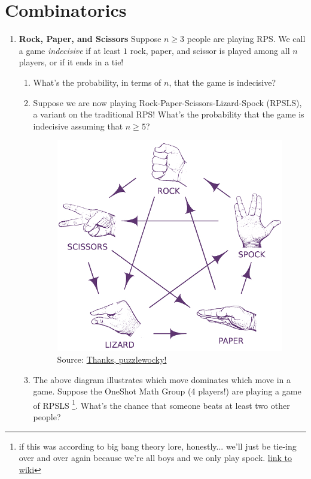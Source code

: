 \documentclass[11pt]{scrartcl}
\begin{document}
\section{Combinatorics}
\begin{enumerate}[label=\textbf{C\arabic*}.]
    \item \textbf{Rock, Paper, and Scissors} \newline
    Suppose $n \geq 3$ people are playing RPS. We call a game \textit{indecisive} if at least $1$ rock, paper, and scissor is played among all $n$ players, or if it ends in a tie!
    
    \begin{enumerate}
        \item What's the probability, in terms of $n$, that the game is indecisive?
        
        \item Suppose we are now playing Rock-Paper-Scissors-Lizard-Spock (RPSLS), a variant on the traditional RPS!  What's the probability that the game is indecisive assuming that $n \geq 5$?
        
        \begin{figure}[h]
            \centering
            \includegraphics[width = 11cm]{Diagrams/RPSLS.png}
            \caption{Source: \href{https://puzzlewocky.com/parlor-games/rock-paper-scissors-lizard-spock/}{Thanks, puzzlewocky!}}
            \label{fig:RPSLS}
        \end{figure}
        
        \item The above diagram illustrates which move dominates which move in a game. Suppose the OneShot Math Group (4 players!) are playing a game of RPSLS \footnote{if this was according to big bang theory lore, honestly... we'll just be tie-ing over and over again because we're all boys and we only play spock. \href{https://bigbangtheory.fandom.com/wiki/Rock,_Paper,_Scissors,_Lizard,_Spock}{link to wiki}}. What's the chance that someone beats at least two other people?
    \end{enumerate}
\end{enumerate}
\end{document}

